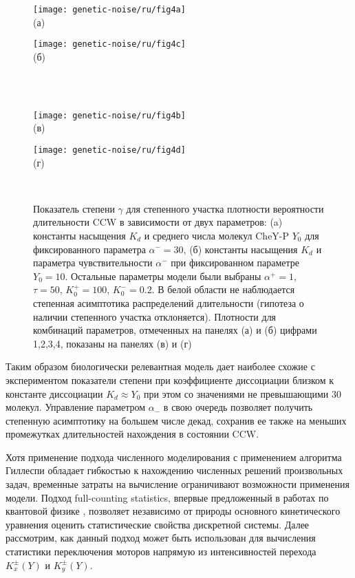 \begin{figure}[ht]
    \begin{minipage}[b][][b]{0.45\linewidth}\centering
        \texttt{[image: genetic-noise/ru/fig4a]} \\ (а)
    \end{minipage}
    \hfill
    \begin{minipage}[b][][b]{0.45\linewidth}\centering
        \texttt{[image: genetic-noise/ru/fig4c]} \\ (б)
    \end{minipage}\\ \\
    \begin{minipage}[b][][b]{0.45\linewidth}\centering
        \texttt{[image: genetic-noise/ru/fig4b]} \\ (в)
    \end{minipage}
    \hfill
    \begin{minipage}[b][][b]{0.45\linewidth}\centering
        \texttt{[image: genetic-noise/ru/fig4d]} \\ (г)
    \end{minipage} \\
    \caption{
        Показатель степени $\gamma$ для степенного участка плотности вероятности длительности CCW в зависимости от двух параметров: (a) константы насыщения $K_d$ и среднего числа молекул CheY-P $Y_0$ для фиксированного параметра $\alpha^- = 30$, (б) константы насыщения $K_d$ и параметра чувствительности $\alpha^-$ при фиксированном параметре $Y_0 = 10$. Остальные параметры модели были выбраны $\alpha^+=1$, $\tau=50$, $K^+_0=100$, $K^-_0=0.2$. В белой области не наблюдается степенная асимптотика распределений длительности (гипотеза о наличии степенного участка отклоняется). Плотности для комбинаций параметров, отмеченных на панелях (а) и (б) цифрами 1,2,3,4, показаны на панелях (в) и (г)
    }\label{fig:pdf-gamma-grid-kd}
\end{figure}

Таким образом биологически релевантная модель дает наиболее схожие с экспериментом показатели степени при коэффициенте диссоциации близком к константе диссоциации $K_d \approx Y_0$ при этом со значениями не превышающими $30$ молекул. Управление параметром $\alpha_-$ в свою очередь позволяет получить степенную асимптотику на большем числе декад, сохранив ее также на меньших промежутках длительностей нахождения в состоянии CCW.

Хотя применение подхода численного моделирования с применением алгоритма Гиллеспи \cite{gillespie_stochastic_2007} обладает гибкостью к нахождению численных решений произвольных задач, временные затраты на вычисление ограничивают возможности применения модели. Подход full-counting statistics, впервые предложенный в работах по квантовой физике \cite{levitov_electron_1996}, позволяет независимо от природы основного кинетического уравнения оценить статистические свойства дискретной системы. Далее рассмотрим, как данный подход может быть использован для вычисления статистики переключения моторов напрямую из интенсивностей перехода $K_x^\pm(Y)$ и $K_y^\pm(Y)$.

